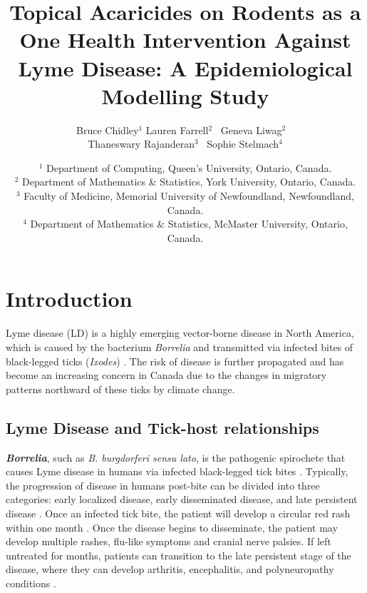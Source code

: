 \documentclass[12pt, centerh1]{article}
\title{Topical Acaricides on Rodents as a One Health Intervention Against Lyme Disease: A Epidemiological Modelling Study}
\author{Bruce Chidley$^{1}$ \qquad Lauren Farrell$^{2}$ \qquad\  Geneva Liwag$^{2}$ \qquad\  \\  Thaneswary Rajanderan$^{3}$ \quad\ Sophie Stelmach$^{4}$}
\date{{\small $^1$ Department of Computing, Queen's University, Ontario, Canada.\\[-6pt]
$^2$ Department of Mathematics \& Statistics, York University, Ontario, Canada.\\[-6pt]
$^3$ Faculty of Medicine, Memorial University of Newfoundland, Newfoundland, Canada. \\[-6pt]
$^4$ Department of Mathematics \& Statistics, McMaster University, Ontario, Canada.\\[-6pt]
}
}
\newcommand{\sophie}[1]{{\textcolor{purple}{$\langle$SS: #1$\rangle$}}}
\newcommand{\thanesh}[1]{{\textcolor{yellow}{$\langle$TR: #1$\rangle$}}}
\begin{document}
\maketitle
{
\hypersetup{linkcolor = black}
\tableofcontents
}
\newpage

\section{Introduction}
Lyme disease (LD) is a highly emerging vector-borne disease in North America, which is caused by the bacterium \textit{Borrelia} and transmitted via infected bites of black-legged ticks (\textit{Ixodes}) \citep{govcan}. The risk of disease is further propagated and has become an increasing concern in Canada due to the changes in migratory patterns northward of these ticks by climate change.

\subsection{Lyme Disease and Tick-host relationships}
\textbf{\textit{Borrelia}}, such as \textit{B. burgdorferi sensu lato}, is the pathogenic spirochete that causes Lyme disease in humans via infected black-legged tick bites \citep{CDC_2022}. Typically, the progression of disease in humans post-bite can be divided into three categories: early localized disease, early disseminated disease, and late persistent disease \citep{MyHealth_Alberta}. Once an infected tick bite, the patient will develop a circular red rash within one month \citep{borrelia_shapiro}. Once the disease begins to disseminate, the patient may develop multiple rashes, flu-like symptoms and cranial nerve palsies. If left untreated for months, patients can transition to the late persistent stage of the disease, where they can develop arthritis, encephalitis, and polyneuropathy conditions \citep{borrelia_shapiro}. 
\end{document}
